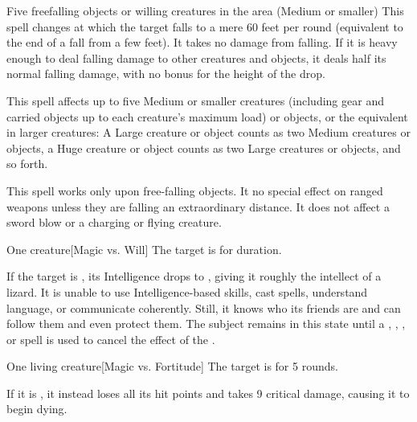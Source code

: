 \begin{spelltargets}{Five freefalling objects or willing creatures in the area (Medium or smaller)}
    \spelleffect This spell changes at which the target falls to a mere 60 feet per round (equivalent to the end of a fall from a few feet). It takes no damage from falling. If it is heavy enough to deal falling damage to other creatures and objects, it deals half its normal falling damage, with no bonus for the height of the drop.
\end{spelltargets}
\spellnotes This spell affects up to five Medium or smaller creatures (including gear and carried objects up to each creature's maximum load) or objects, or the equivalent in larger creatures: A Large creature or object counts as two Medium creatures or objects, a Huge creature or object counts as two Large creatures or objects, and so forth.

This spell works only upon free-falling objects. It no special effect on ranged weapons unless they are falling an extraordinary distance. It does not affect a sword blow or a charging or flying creature.

\begin{spelltarget}{One creature}[Magic vs. Will]
    \spellsuccess The target is \bewildered for \durshort duration.

    If the target is \bloodied, its Intelligence drops to , giving it roughly the intellect of a lizard. It is unable to use Intelligence-based skills, cast spells, understand language, or communicate coherently. Still, it knows who its friends are and can follow them and even protect them. The subject remains in this state until a , , , or  spell is used to cancel the effect of the .
\end{spelltarget}

\spellrng{\rngclose}
\begin{spelltarget}{One living creature}[Magic vs. Fortitude]
    \spellsuccess The target is \staggered for 5 rounds.

    If it is \bloodied, it instead loses all its hit points and takes 9 critical damage, causing it to begin dying.
\end{spelltarget}


